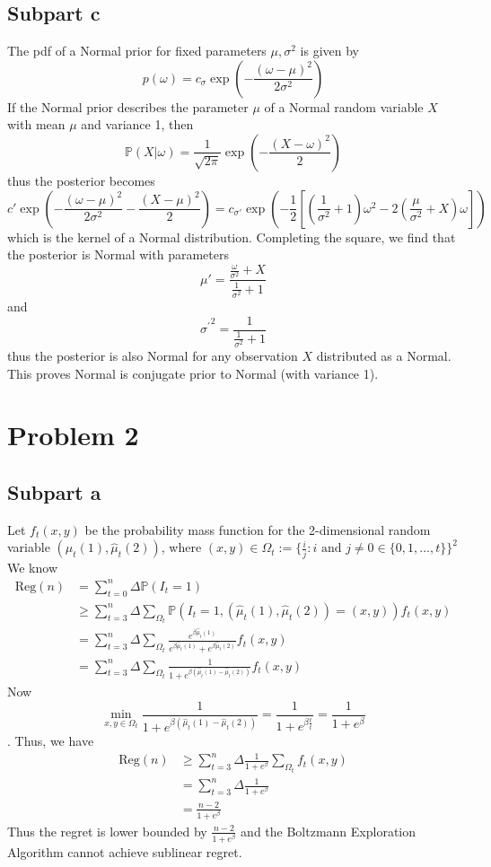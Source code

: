 \documentclass{article}
\theoremstyle{mytheoremstyle}
\theoremstyle{mytheoremstyle}
\theoremstyle{myproblemstyle}
\begin{document}
\subsection*{Subpart c}
The pdf of a Normal prior for fixed parameters $\mu, \sigma^2$ is given by 
$$p(\omega) = c_\sigma \exp\left(-\frac{(\omega - \mu)^2}{2\sigma^2}\right)$$
If the Normal prior describes the parameter $\mu$ of a Normal random variable $X$ with mean $\mu$ and variance 1, then 
$$\mathbb P(X | \omega) = \frac{1}{\sqrt{2\pi}} \exp\left(-\frac{(X - \omega)^2}{2}\right)$$
thus the posterior becomes 
$$ c' \exp\left(-\frac{(\omega - \mu)^2}{2\sigma^2} - \frac{(X - \mu)^2}{2}\right) = c_{\sigma'} \exp\left(-\frac{1}{2}\left[\left(\frac{1}{\sigma^2} + 1\right)\omega^2 - 2\left(\frac{\mu}{\sigma^2} + X\right)\omega\right]\right)$$
which is the kernel of a Normal distribution. Completing the square, we find that the posterior is Normal with parameters
$$\mu' = \frac{\frac{\omega}{\sigma^2} + X}{\frac{1}{\sigma^2} + 1}$$
and
$${\sigma^\prime}^2 = \frac{1}{\frac{1}{\sigma^2} + 1}$$
thus the posterior is also Normal for any observation $X$ distributed as a Normal.
This proves Normal is conjugate prior to Normal (with variance 1).

\section*{Problem 2}

\subsection*{Subpart a}
Let $f_t(x,y)$ be the probability mass function for the 2-dimensional random variable $(\hat\mu_t(1), \hat\mu_t(2))$,
where $(x,y) \in \Omega_t := \{ \frac{i}{j} : i \text{ and } j\neq 0 \in \{0,1,\ldots,t\}\}^2$
We know 
\begin{align*}
  \text{Reg}(n) &= \sum_{t=0}^n \Delta \mathbb P(I_t = 1)\\
                &\geq \sum_{t=3}^n \Delta \sum_{\Omega_t} \mathbb P(I_t = 1, (\hat\mu_t(1), \hat\mu_t(2)) = (x,y)) f_t(x,y)\\
                &= \sum_{t=3}^n \Delta \sum_{\Omega_t} \frac{e^{\beta \hat\mu_t(1)}}{e^{\beta \hat\mu_t(1)} + e^{\beta \hat\mu_t(2)}} f_t(x,y)\\
                &= \sum_{t=3}^n \Delta \sum_{\Omega_t} \frac{1}{1 + e^{\beta (\hat\mu_t(1) - \hat\mu_t(2))}} f_t(x,y)
\end{align*}
Now $$\min_{x,y \in \Omega_t} \frac{1}{1 + e^{\beta (\hat\mu_t(1) - \hat\mu_t(2))}} = \frac{1}{1 + e^{\beta \frac{t}{t}}} = \frac{1}{1 + e^\beta}$$.
Thus, we have 
\begin{align*}
  \text{Reg}(n) &\geq \sum_{t=3}^n \Delta \frac{1}{1 + e^\beta} \sum_{\Omega_t} f_t(x,y)\\
                &= \sum_{t=3}^n \Delta \frac{1}{1 + e^\beta}\\ 
                &= \frac{n-2}{1 + e^\beta}
\end{align*}
Thus the regret is lower bounded by $\frac{n-2}{1 + e^\beta}$ and the Boltzmann Exploration Algorithm cannot achieve sublinear regret.
\end{document}
